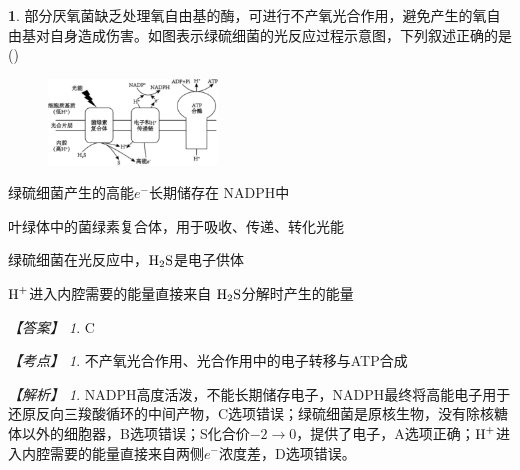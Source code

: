 \documentclass[UTF8, 10pt, a4paper, oneside]{ctexart}
\theoremstyle{definition}
\newtheorem{exercise}{}
\theoremstyle{remark}
\newtheorem*{answer}{【答案】}
\newtheorem*{point}{【考点】}      %
\newtheorem*{explanation}{【解析】}     %
\theoremstyle{plain}
\begin{document}
\begin{exercise}
部分厌氧菌缺乏处理氧自由基的酶，可进行不产氧光合作用，避免产生的氧自由基对自身造成伤害。如图表示绿硫细菌的光反应过程示意图，下列叙述正确的是\quad(\quad)
    \begin{figure}[h!]
        \centering
        \includegraphics[width=0.4\textwidth]{assists/14-2.jpg}
    \end{figure}
    \begin{adjustwidth}{2em}{}
            \begin{asparaenum}[A. ]
                \item 绿硫细菌产生的高能$e^-$长期储存在 NADPH中
                \item 叶绿体中的菌绿素复合体，用于吸收、传递、转化光能
                \item 绿硫细菌在光反应中，$\ce{H2S}$是电子供体
                \item $\ce{H+}$进入内腔需要的能量直接来自 $\ce{H2S}$分解时产生的能量
            \end{asparaenum}
    \end{adjustwidth}
    \begin{answer}
        C
    \end{answer}
    \begin{point}
        不产氧光合作用、光合作用中的电子转移与ATP合成
    \end{point}
    \begin{explanation}
        NADPH高度活泼，不能长期储存电子，NADPH最终将高能电子用于还原反向三羧酸循环的中间产物，C选项错误；绿硫细菌是原核生物，没有除核糖体以外的细胞器，B选项错误；S化合价$-2 \rightarrow 0$，提供了电子，A选项正确；$\ce{H+}$进入内腔需要的能量直接来自两侧$e^-$浓度差，D选项错误。
    \end{explanation}
\end{exercise}
\end{document}
